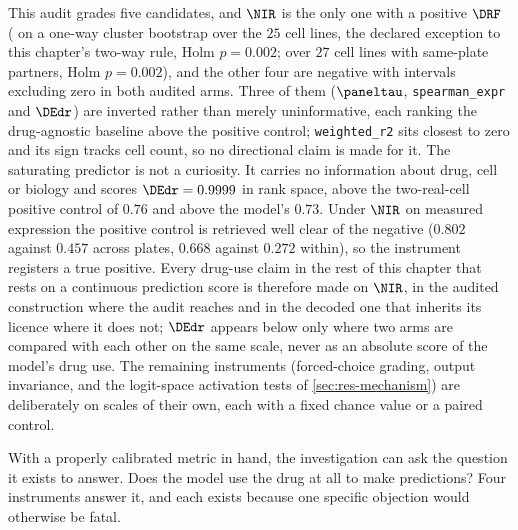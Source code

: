 \begin{claim}
This audit grades five candidates, and $\NIR$ is the only
one with a positive $\DRF$ ( on a one-way cluster
bootstrap over the $25$ cell lines, the declared exception to this chapter's
two-way rule, Holm $p = 0.002$;  over $27$ cell lines
with same-plate partners, Holm $p = 0.002$), and the other four are negative with
intervals excluding zero in both audited arms. Three of them ($\paneltau$,
\texttt{spearman\_expr} and $\DEdr$) are inverted rather than merely
uninformative, each ranking the drug-agnostic baseline above the positive
control; \texttt{weighted\_r2} sits closest to zero and its sign tracks cell
count, so no directional claim is made for it. The saturating predictor is not a
curiosity. It carries no information about drug, cell or biology and scores
$\DEdr = 0.9999$ in rank space, above the two-real-cell positive control of
$0.76$ and above the model's $0.73$. Under $\NIR$ on measured expression the positive control is retrieved well clear of
the negative ($0.802$ against $0.457$ across plates, $0.668$ against $0.272$
within), so the instrument registers a true positive. Every drug-use claim in
the rest of this chapter that rests on a continuous prediction score is
therefore made on $\NIR$, in the audited construction where the audit reaches
and in the decoded one that inherits its licence where it does not; $\DEdr$
appears below only where two arms are compared with each other on the same
scale, never as an absolute score of the model's drug use. The remaining instruments (forced-choice grading,
output invariance, and the logit-space activation tests of
\cref{sec:res-mechanism}) are deliberately on scales of their own, each with a
fixed chance value or a paired control.
\end{claim}


\label{sec:methods-controls}   %


\begin{question}[2]
With a properly calibrated metric in hand, the investigation can ask the
question it exists to answer. Does the model use the drug at all to make predictions? Four
instruments answer it, and each exists because one specific objection would
otherwise be fatal.
\end{question}

